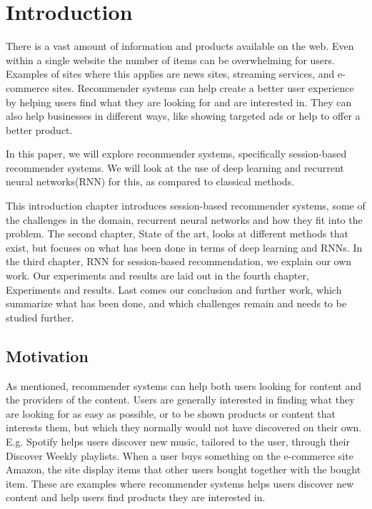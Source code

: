 \chapter{Introduction}
There is a vast amount of information and products available on the web. Even within a single website the number of items can be overwhelming for users. Examples of sites where this applies are news sites, streaming services, and e-commerce sites. Recommender systems can help create a better user experience by helping users find what they are looking for and are interested in. They can also help businesses in different ways, like showing targeted ads or help to offer a better product.

In this paper, we will explore recommender systems, specifically session-based recommender systems. We will look at the use of deep learning and recurrent neural networks(RNN) for this, as compared to classical methods.

This introduction chapter introduces session-based recommender systems, some of the challenges in the domain, recurrent neural networks and how they fit into the problem.
The second chapter, State of the art, looks at different methods that exist, but focuses on what has been done in terms of deep learning and RNNs.
In the third chapter, RNN for session-based recommendation, we explain our own work.
Our experiments and results are laid out in the fourth chapter, Experiments and results.
Last comes our conclusion and further work, which summarize what has been done, and which challenges remain and needs to be studied further.

%


\section{Motivation}
\label{sec:motivation}

As mentioned, recommender systems can help both users looking for content and the providers of the content. Users are generally interested in finding what they are looking for as easy as possible, or to be shown products or content that interests them, but which they normally would not have discovered on their own. E.g. Spotify helps users discover new music, tailored to the user, through their Discover Weekly\cite{discover-weekly} playlists. When a user buys something on the e-commerce site Amazon, the site display items that other users bought together with the bought item. These are examples where recommender systems helps users discover new content and help users find products they are interested in.

